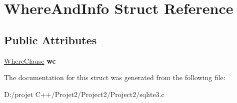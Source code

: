 \hypertarget{struct_where_and_info}{}\section{Where\+And\+Info Struct Reference}
\label{struct_where_and_info}
\subsection*{Public Attributes}
\begin{DoxyCompactItemize}
\item 
\mbox{\label{struct_where_and_info_a01cea99f069b1e598004a1cd0d0c3a80}} 
\mbox{\hyperlink{struct_where_clause}{Where\+Clause}} {\bfseries wc}
\end{DoxyCompactItemize}


The documentation for this struct was generated from the following file\+:\begin{DoxyCompactItemize}
\item 
D\+:/projet C++/\+Projet2/\+Project2/\+Project2/sqlite3.\+c\end{DoxyCompactItemize}
